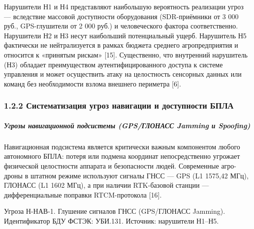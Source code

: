 \documentclass[14pt,a4paper]{extarticle}
\begin{document}
Нарушители Н1 и Н4 представляют наибольшую вероятность реализации угроз --- вследствие массовой доступности оборудования (SDR-приёмники от 3 000 руб., GPS-глушители от 2 000 руб.) и человеческого фактора соответственно. Нарушители Н2 и Н3 несут наибольший потенциальный ущерб. Нарушитель Н5 фактически не нейтрализуется в рамках бюджета среднего агропредприятия и относится к «принятым рискам» {[}15{]}. Существенно, что внутренний нарушитель (Н3) обладает преимуществом аутентифицированного доступа к системе управления и может осуществить атаку на целостность сенсорных данных или команд без необходимости взлома внешнего периметра {[}6{]}.

\hypertarget{ux441ux438ux441ux442ux435ux43cux430ux442ux438ux437ux430ux446ux438ux44f-ux443ux433ux440ux43eux437-ux43dux430ux432ux438ux433ux430ux446ux438ux438-ux438-ux434ux43eux441ux442ux443ux43fux43dux43eux441ux442ux438-ux431ux43fux43bux430}{%
\subsubsection{1.2.2 Систематизация угроз навигации и доступности БПЛА}\label{ux441ux438ux441ux442ux435ux43cux430ux442ux438ux437ux430ux446ux438ux44f-ux443ux433ux440ux43eux437-ux43dux430ux432ux438ux433ux430ux446ux438ux438-ux438-ux434ux43eux441ux442ux443ux43fux43dux43eux441ux442ux438-ux431ux43fux43bux430}}

\hypertarget{ux443ux433ux440ux43eux437ux44b-ux43dux430ux432ux438ux433ux430ux446ux438ux43eux43dux43dux43eux439-ux43fux43eux434ux441ux438ux441ux442ux435ux43cux44b-gpsux433ux43bux43eux43dux430ux441ux441-jamming-ux438-spoofing}{%
\subparagraph{Угрозы навигационной подсистемы (GPS/ГЛОНАСС Jamming и Spoofing)}\label{ux443ux433ux440ux43eux437ux44b-ux43dux430ux432ux438ux433ux430ux446ux438ux43eux43dux43dux43eux439-ux43fux43eux434ux441ux438ux441ux442ux435ux43cux44b-gpsux433ux43bux43eux43dux430ux441ux441-jamming-ux438-spoofing}}

Навигационная подсистема является критически важным компонентом любого автономного БПЛА: потеря или подмена координат непосредственно угрожает физической целостности аппарата и безопасности людей. Современные агро-дроны в штатном режиме используют сигналы ГНСС --- GPS (L1 1575,42 МГц), ГЛОНАСС (L1 1602 МГц), а при наличии RTK-базовой станции --- дифференциальные поправки RTCM-протокола {[}16{]}.

Угроза Н-НАВ-1. Глушение сигналов ГНСС (GPS/ГЛОНАСС Jamming). Идентификатор БДУ ФСТЭК: УБИ.131. Источник: нарушители Н1--Н5.
\end{document}
